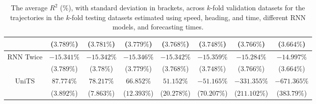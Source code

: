 \begin{table}[!ht]
{\begin{tabular}{|c|c|c|c|c|c|c|c|}
			 & ($3.789\%$) & ($3.781\%$) & ($3.779\%$) & ($3.768\%$) & ($3.748\%$) & ($3.766\%$) & ($3.664\%$) \\ \hline
			\multirow{2}{*}{RNN Twice} & $-15.341\%$ & $-15.342\%$ & $-15.346\%$ & $-15.342\%$ & $-15.359\%$ & $-15.284\%$ & $-14.997\%$ \\
			 & ($3.789\%$) & ($3.78\%$) & ($3.779\%$) & ($3.768\%$) & ($3.748\%$) & ($3.766\%$) & ($3.664\%$) \\ \hline
			\multirow{2}{*}{UniTS} & $87.774\%$ & $78.217\%$ & $66.852\%$ & $51.152\%$ & $-51.165\%$ & $-331.355\%$ & $-671.365\%$ \\
			 & ($3.892\%$) & ($7.863\%$) & ($12.393\%$) & ($20.278\%$) & ($70.207\%$) & ($211.102\%$) & ($383.79\%$) \\ \hline
		\end{tabular}
	}
	\caption{The average $R^{2}$ (\%), with standard deviation in brackets, across $k$-fold validation datasets for the trajectories in the $k$-fold testing datasets estimated using speed, heading, and time, different RNN models, and forecasting times.}
	\label{tab:all_speed_actual_dir_R2}
\end{table}


